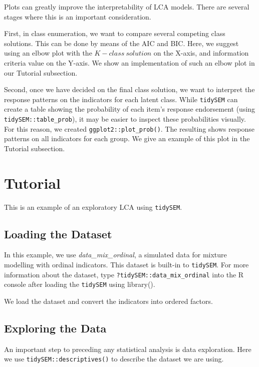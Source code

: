 \documentclass[
  ,man,floatsintext]{apa6}
\begin{document}
Plots can greatly improve the interpretability of LCA models.
There are several stages where this is an important consideration.

First, in class enumeration,
we want to compare several competing class solutions.
This can be done by means of the AIC and BIC.
Here, we suggest using an elbow plot
with the \(K-class\ solution\) on the X-axis,
and information criteria value on the Y-axis.
We show an implementation of such an elbow plot
in our Tutorial subsection.

Second, once we have decided on the final class solution,
we want to interpret the response patterns
on the indicators for each latent class.
While \texttt{tidySEM} can create a table showing
the probability of each item's response endorsement
(using \texttt{tidySEM::table\_prob}),
it may be easier to inspect these probabilities visually.
For this reason, we created \texttt{ggplot2::plot\_prob()}.
The resulting shows response patterns
on all indicators for each group.
We give an example of this plot in the Tutorial subsection.

\hypertarget{tutorial}{%
\section{Tutorial}\label{tutorial}}

This is an example of an exploratory LCA using \texttt{tidySEM}.

\hypertarget{loading-the-dataset}{%
\subsection{Loading the Dataset}\label{loading-the-dataset}}

In this example, we use \emph{data\_mix\_ordinal},
a simulated data for mixture modelling with ordinal indicators.
This dataset is built-in to \texttt{tidySEM}.
For more information about the dataset,
type \texttt{?tidySEM::data\_mix\_ordinal} into the R console
after loading the \texttt{tidySEM} using library().

We load the dataset and convert the indicators into ordered factors.

\hypertarget{exploring-the-data}{%
\subsection{Exploring the Data}\label{exploring-the-data}}

An important step to preceding any statistical analysis is data exploration.
Here we use \texttt{tidySEM::descriptives()}
to describe the dataset we are using.
\end{document}
